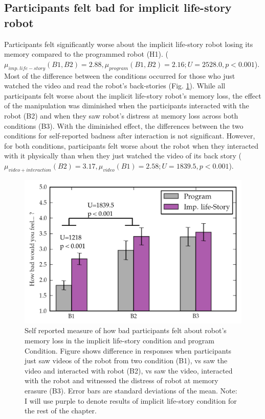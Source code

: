 \subsection{Participants felt bad for implicit life-story robot}

Participants felt significantly worse about the implicit life-story robot losing its memory compared to the programmed robot (H1). ($\mu_{imp.\ life-story}(B1, B2)=2.88, \mu_{program}(B1, B2)=2.16; U=2528.0, p < 0.001$). Most of the difference between the conditions occurred for those who just watched the video and read the robot's back-stories (Fig. \ref{fig_study_badness}). While all participants felt worse about the implicit life-story robot's memory loss, the effect of the manipulation was diminished when the participants interacted with the robot (B2) and when they saw robot's distress at memory loss across both conditions (B3).  With the diminished effect, the differences between the two conditions for self-reported badness after interaction is not significant. However, for both conditions, participants felt worse about the robot when they interacted with it physically than when they just watched the video of its back story ($\mu_{video + interaction}(B2)=3.17, \mu_{video}(B1)=2.58; U=1839.5, p < 0.001$). 

   \begin{figure}[thpb]
      \centering
      \includegraphics[width=4.5in]{figures/study/rev2/bad/badness.png}
      \caption{Self reported measure of how bad participants felt about robot's memory loss in the implicit life-story condition and program Condition. Figure shows difference in responses when participants just saw videos of the robot from two condition (B1), vs saw the video and interacted with robot (B2), vs saw the video, interacted with the robot and witnessed the distress of robot at memory erasure (B3). Error bars are standard deviations of the mean. Note: I will use purple to denote results of implicit life-story condition for the rest of the chapter.}
      \label{fig_study_badness}
   \end{figure}

